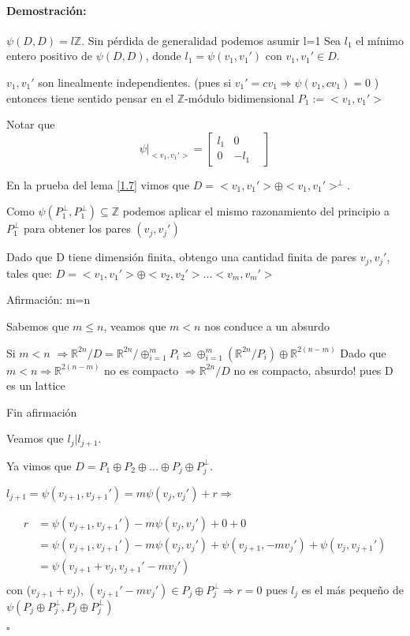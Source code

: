 \documentclass[12pt]{article}
\newenvironment{proof}{\paragraph{Demostración:}}{\hfill$\square$}
\begin{document}
\begin{proof}
$\psi(D,D)  = l \mathbb{Z}$. Sin pérdida de generalidad podemos asumir l=1
Sea $l_1$ el mínimo entero positivo de $\psi(D,D)$, donde $l_1=\psi(v_1,v_1')$ con $v_1,v_1' \in D$. 

$v_1,v_1'$ son linealmente independientes. (pues si $v_1'=c v_1 \Rightarrow \psi(v_1,c v_1)=0$ ) entonces tiene sentido
pensar en el $\mathbb{Z}$-módulo bidimensional $P_1:=<v_1,v_1'>$

Notar que $$
\psi|_{<v_1,v_1'>} = \begin{bmatrix}
                              l_1 & 0 &\\
                              0 & -l_1 &
                             \end{bmatrix}
$$

En la prueba del lema \ref{1.7} vimos que $D=<v_1,v_1'> \oplus <v_1,v_1'>^\bot$.

Como $\psi(P_1^\bot,P_1^\bot) \subseteq \mathbb{Z}$ podemos aplicar el mismo razonamiento del principio a $P_1^\bot$ 
para obtener los pares $(v_j,v_j')$

Dado que D tiene dimensión finita, obtengo una cantidad finita de pares $v_j,v_j'$, tales que:
$D=<v_1,v_1'>\oplus<v_2,v_2'>...<v_m,v_m'>$

Afirmación: m=n

Sabemos que $m\leq n$, veamos que $m<n$ nos conduce a un absurdo

Si $m<n$ $\Rightarrow \mathbb{R}^{2n}/D=\mathbb{R}^{2n}/\oplus_{i=1}^m P_i \backsimeq \oplus_{i=1}^m (\mathbb{R}^{2n}/P_i) \oplus \mathbb{R}^{2(n-m)} $\newline
Dado que $m<n \Rightarrow  \mathbb{R}^{2(n-m)}$ no es compacto $\Rightarrow \mathbb{R}^{2n}/D$ no es compacto, absurdo! pues D es un lattice

Fin afirmación
\newline

Veamos que $l_j|l_{j+1}$.

Ya vimos que $D= P_1\oplus P_2 \oplus...\oplus P_j \oplus P_j^\bot$.

$l_{j+1}=\psi(v_{j+1},v_{j+1}')=m \psi(v_j,v_j') +r \Rightarrow$ 

$$\begin{aligned}
r&=\psi(v_{j+1},v_{j+1}')-m \psi(v_j,v_j') + 0 + 0\\
&=\psi(v_{j+1},v_{j+1}')-m \psi(v_j,v_j') +  \psi(v_{j+1},-mv_j') + \psi(v_j,v_{j+1}')\\
&=\psi(v_{j+1} + v_j, v_{j+1}'-m v_j') \\
\end{aligned}$$ 
con ($v_{j+1} + v_j) $, $(v_{j+1}'-m v_j') \in P_j \oplus P_j^\bot \Rightarrow
r=0$ pues $l_j$ es el más pequeño de $\psi(P_j \oplus P_j^\bot, P_j \oplus P_j^\bot)$
\newline


\end{proof}
\end{document}
